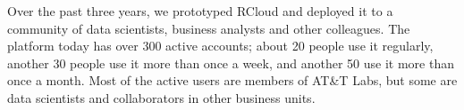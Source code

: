Over the past three years, we prototyped RCloud and deployed it to
a community of data scientists, business analysts and other colleagues. The
platform today has over 300 active accounts; about 20 people use it regularly,
another 30 people use it more than once a week, and another 50 use it more than
once a month. Most of the
active users are members of AT\&T Labs, but some are data scientists and
collaborators in other business units.
